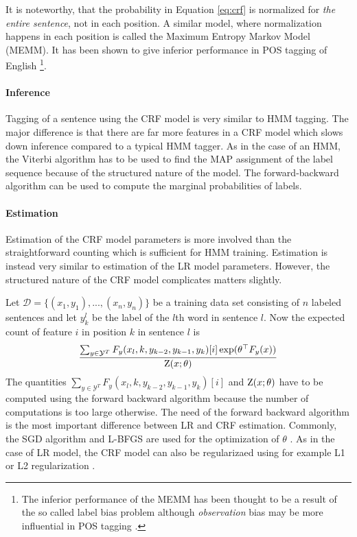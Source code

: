 It is noteworthy, that the probability in Equation \ref{eq:crf} is
normalized for {\it the entire sentence}, not in each position. A
similar model, where normalization happens in each position is called
the Maximum Entropy Markov Model (MEMM). It has been shown to give
inferior performance in POS tagging of English
\citep{Lafferty2001}\footnote{The inferior performance of the MEMM has
  been thought to be a result of the so called label bias problem
  \citep{Lafferty2001} although {\it observation} bias may be more
  influential in POS tagging \citep{Klein2002}.}.

\paragraph{Inference} Tagging of a sentence using the CRF model is
very similar to HMM tagging. The major difference is that there are
far more features in a CRF model which slows down inference compared
to a typical HMM tagger. As in the case of an HMM, the Viterbi
algorithm has to be used to find the MAP assignment of the label
sequence because of the structured nature of the model. The
forward-backward algorithm can be used to compute the marginal
probabilities of labels.

\paragraph{Estimation} Estimation of the CRF model parameters is more
involved than the straightforward counting which is sufficient for HMM
training. Estimation is instead very similar to estimation of the LR
model parameters. However, the structured nature of the CRF model
complicates matters slightly.

Let $\mathcal{D} = \{(x_1, y_1), ..., (x_n, y_n)\}$ be a training data
set consisting of $n$ labeled sentences and let $y_k^l$ be the label
of the $l$th word in sentence $l$. Now the expected count of feature
$i$ in position $k$ in sentence $l$ is
$$\frac{\sum_{y \in \mathcal{Y}^T}F_y(x_l, k, y_{k - 2}, y_{k-1}, y_k)[i] \exp(\theta^\top F_y(x))}{\mbox{${\rm Z}$}(x\mbox{$ ; \, $}\theta)}$$
The quantities $\sum_{y \in \mathcal{Y}^T}F_y(x_l, k, y_{k - 2},
y_{k-1}, y_k)[i]$ and $\mbox{${\rm Z}$}(x\mbox{$ ; \, $}\theta)$ have to be computed using
the forward backward algorithm because the number of computations is
too large otherwise. The need of the forward backward algorithm is the
most important difference between LR and CRF estimation.  Commonly,
the SGD algorithm and L-BFGS are used for the optimization of $\theta$
\citep{Vishwanathan2006}. As in the case of LR model, the CRF model
can also be regularizaed using for example L1 or L2 regularization
\cite{Sutton2006}.


